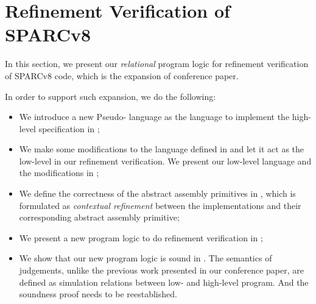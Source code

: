 \section{Refinement Verification of SPARCv8}
\label{sec:refine-verification-sparc}

In this section, we present our \textit{relational} 
program logic for refinement verification of 
SPARCv8 code, which is the expansion of conference paper. 
{\color{blue}
In order to support such expansion, we do the following:
\begin{itemize}
    \item We introduce a new Pseudo-\sparc{} language 
        as the language to implement the high-level 
        specification in 
        \Sec{\ref{subsec:High-level Pseudo-SPARCv8 Language}}; 
    \item We make some modifications to the \sparc{} 
        language defined in \Sec{\ref{sec:modeling}} and 
        let it act as the low-level in our refinement 
        verification. We present our low-level \sparc{} 
        language and the modifications in 
        \Sec{\ref{subsec:low-level SPARCv8 Program}};
    \item We define the correctness of the abstract 
        assembly primitives in 
        \Sec{\ref{subsec:correctness-primitive}}, 
        which is formulated as \textit{contextual refinement}
        between the implementations and their 
        corresponding abstract assembly primitive; 
    \item We present a new program logic to do 
        refinement verification in 
        \Sec{\ref{subsec:rellogic}}; 
    \item We show that our new program logic is 
        sound in \Sec{\ref{subsec:semantics and soundness}}.
        The semantics of judgements,
        unlike the previous work presented in our 
        conference paper, are defined as 
        simulation relations between low- and high-level 
        program. And the soundness proof needs to 
        be reestablished. 
\end{itemize}
} 

